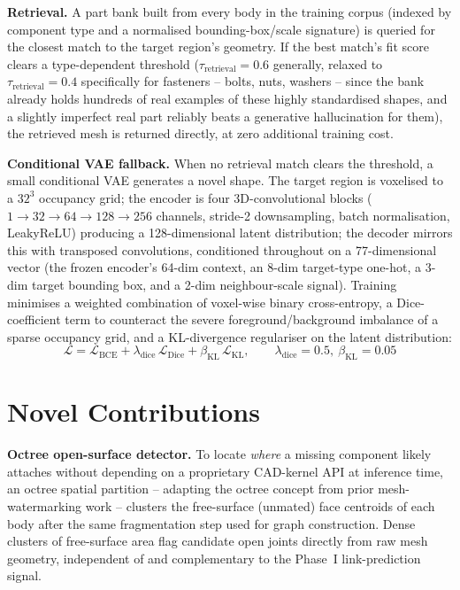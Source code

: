 \documentclass[sn-mathphys,Numbered]{sn-jnl}
\begin{document}
\textbf{Retrieval.} A part bank built from every body in the training corpus (indexed by component type and a normalised bounding-box/scale signature) is queried for the closest match to the target region's geometry. If the best match's fit score clears a type-dependent threshold ($\tau_{\text{retrieval}}=0.6$ generally, relaxed to $\tau_{\text{retrieval}}=0.4$ specifically for fasteners -- bolts, nuts, washers -- since the bank already holds hundreds of real examples of these highly standardised shapes, and a slightly imperfect real part reliably beats a generative hallucination for them), the retrieved mesh is returned directly, at zero additional training cost.

\textbf{Conditional VAE fallback.} When no retrieval match clears the threshold, a small conditional VAE generates a novel shape. The target region is voxelised to a $32^3$ occupancy grid; the encoder is four 3D-convolutional blocks ($1\!\to\!32\!\to\!64\!\to\!128\!\to\!256$ channels, stride-2 downsampling, batch normalisation, LeakyReLU) producing a 128-dimensional latent distribution; the decoder mirrors this with transposed convolutions, conditioned throughout on a 77-dimensional vector (the frozen encoder's 64-dim context, an 8-dim target-type one-hot, a 3-dim target bounding box, and a 2-dim neighbour-scale signal). Training minimises a weighted combination of voxel-wise binary cross-entropy, a Dice-coefficient term to counteract the severe foreground/background imbalance of a sparse occupancy grid, and a KL-divergence regulariser on the latent distribution:
\begin{equation}
\mathcal{L} = \mathcal{L}_{\text{BCE}} + \lambda_{\text{dice}}\,\mathcal{L}_{\text{Dice}} + \beta_{\text{KL}}\,\mathcal{L}_{\text{KL}}, \qquad \lambda_{\text{dice}}=0.5,\ \beta_{\text{KL}}=0.05
\label{eq:vaeloss}
\end{equation}

\section{Novel Contributions}\label{sec:novel}

\textbf{Octree open-surface detector.} To locate \emph{where} a missing component likely attaches without depending on a proprietary CAD-kernel API at inference time, an octree spatial partition -- adapting the octree concept from prior mesh-watermarking work \cite{borah2020watermark} -- clusters the free-surface (unmated) face centroids of each body after the same fragmentation step used for graph construction. Dense clusters of free-surface area flag candidate open joints directly from raw mesh geometry, independent of and complementary to the Phase~I link-prediction signal.
\end{document}
